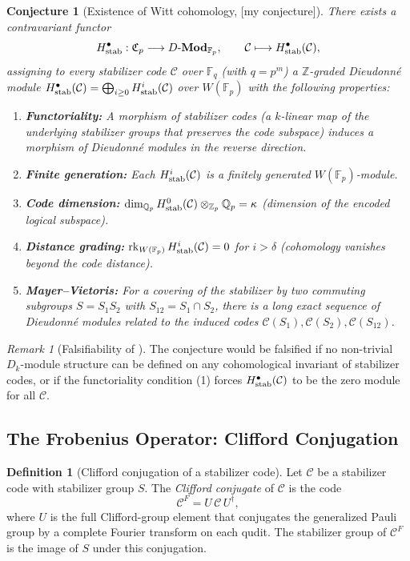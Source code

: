 \documentclass[12pt]{article}
\theoremstyle{definition}
\newtheorem{definition}{Definition}[section]
\theoremstyle{plain}
\newtheorem{conjecture}{Conjecture}[section]
\theoremstyle{remark}
\newtheorem{remark}{Remark}[section]
\newcommand{\myconj}{{\color{orange}[\textsf{my conjecture}]}}
\newcommand{\Fp}{\mathbb{F}_p}
\newcommand{\Fq}{\mathbb{F}_q}
\newcommand{\Zp}{\mathbb{Z}_p}
\newcommand{\Qp}{\mathbb{Q}_p}
\newcommand{\cC}{\mathcal{C}}
\newcommand{\cD}{D\text{-}\mathbf{Mod}}
\newcommand{\Dk}{D_k}
\begin{document}
\begin{conjecture}[Existence of Witt cohomology, \myconj]\label{conj:witt-cohomology}
There exists a contravariant functor
\[
H^{\bullet}_{\textup{stab}}:\mathfrak{C}_p\longrightarrow\cD_{\Fp},
\qquad
\cC\longmapsto H^{\bullet}_{\textup{stab}}(\cC),
\]
assigning to every stabilizer code $\cC$ over $\Fq$ (with $q=p^m$) a $\mathbb{Z}$-graded Dieudonn\'{e} module $H^{\bullet}_{\textup{stab}}(\cC)=\bigoplus_{i\geq0}H^{i}_{\textup{stab}}(\cC)$ over $W(\Fp)$ with the following properties:
\begin{enumerate}[label=(\arabic*),nosep]
  \item \textbf{Functoriality:} A morphism of stabilizer codes (a $k$-linear map of the underlying stabilizer groups that preserves the code subspace) induces a morphism of Dieudonn\'{e} modules in the reverse direction.
  \item \textbf{Finite generation:} Each $H^{i}_{\textup{stab}}(\cC)$ is a finitely generated $W(\Fp)$-module.
  \item \textbf{Code dimension:} $\dim_{\Qp} H^{0}_{\textup{stab}}(\cC)\otimes_{\Zp}\Qp = \kappa$ (dimension of the encoded logical subspace).
  \item \textbf{Distance grading:} $\operatorname{rk}_{W(\Fp)} H^{i}_{\textup{stab}}(\cC)=0$ for $i>\delta$ (cohomology vanishes beyond the code distance).
  \item \textbf{Mayer--Vietoris:} For a covering of the stabilizer by two commuting subgroups $S=S_1S_2$ with $S_{12}=S_1\cap S_2$, there is a long exact sequence of Dieudonn\'{e} modules related to the induced codes $\cC(S_1),\cC(S_2),\cC(S_{12})$.
\end{enumerate}
\end{conjecture}

\begin{remark}[Falsifiability of ]
The conjecture would be falsified if no non-trivial $\Dk$-module structure can be defined on any cohomological invariant of stabilizer codes, or if the functoriality condition (1) forces $H^{\bullet}_{\textup{stab}}(\cC)$ to be the zero module for all $\cC$.
\end{remark}

\subsection{The Frobenius Operator: Clifford Conjugation}

\begin{definition}[Clifford conjugation of a stabilizer code]
Let $\cC$ be a stabilizer code with stabilizer group $S$. The \emph{Clifford conjugate} of $\cC$ is the code
\[
\cC^F = U\,\cC\,U^{\dagger},
\]
where $U$ is the full Clifford-group element that conjugates the generalized Pauli group by a complete Fourier transform on each qudit. The stabilizer group of $\cC^F$ is the image of $S$ under this conjugation.
\end{definition}
\end{document}
